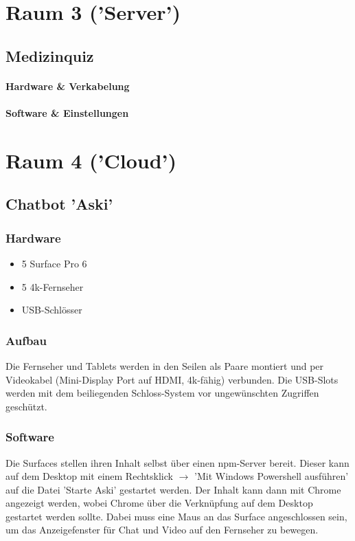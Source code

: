 \documentclass [titlepage,a4paper]{article}
\begin{document}
\newpage
\section{Raum 3 ('Server')}

\subsection{Medizinquiz}

\paragraph{Hardware \& Verkabelung}

\paragraph{Software \& Einstellungen}



\newpage
\section{Raum 4 ('Cloud')}

\subsection{Chatbot 'Aski'}

\subsubsection{Hardware}

\begin{itemize}
\item 5 Surface Pro 6
\item 5 4k-Fernseher
\item USB-Schlösser
\end{itemize}

\subsubsection{Aufbau}

Die Fernseher und Tablets werden in den Seilen als Paare montiert und per Videokabel (Mini-Display Port auf HDMI, 4k-fähig) verbunden. Die USB-Slots werden mit dem beiliegenden Schloss-System vor ungewünschten Zugriffen geschützt.

\subsubsection{Software}

Die Surfaces stellen ihren Inhalt selbst über einen npm-Server bereit. Dieser kann auf dem Desktop mit einem Rechtsklick $\rightarrow$ 'Mit Windows Powershell ausführen' auf die Datei 'Starte Aski' gestartet werden. Der Inhalt kann dann mit Chrome angezeigt werden, wobei Chrome über die Verknüpfung auf dem Desktop gestartet werden sollte. Dabei muss eine Maus an das Surface angeschlossen sein, um das Anzeigefenster für Chat und Video auf den Fernseher zu bewegen.
\end{document}

